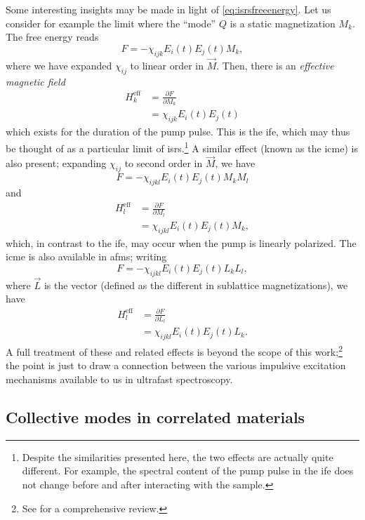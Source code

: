 Some interesting insights may be made in light of \cref{eq:isrsfreeenergy}.
Let us consider for example the limit where the ``mode'' $Q$ is a static magnetization $M_k$.
The free energy reads\citep{juraschek_phono-magnetic_2020}
\begin{equation}
F = -\chi_{ijk}E_i(t)E_j(t)M_k,
\end{equation}
where we have expanded $\chi_{ij}$ to linear order in $\vec{M}$.
Then, there is an \emph{effective magnetic field}
\begin{align}
H^\mathrm{eff}_k &= \frac{\partial F}{\partial M_k}\\
&= \chi_{ijk}E_i(t)E_j(t)
\end{align}
which exists for the duration of the pump pulse.
This is the \gls{ife}, which may thus be thought of as a particular limit of \gls{isrs}.\footnote{Despite the similarities presented here, the two effects are actually quite different. For example, the spectral content of the pump pulse in the \gls{ife} does not change before and after interacting with the sample\citep{gridnev_phenomenological_2008}.}
A similar effect (known as the \gls{icme}) is also present; expanding $\chi_{ij}$ to second order in $\vec{M}$, we have
\begin{equation}
F = -\chi_{ijkl}E_i(t)E_j(t)M_kM_l
\end{equation}
and
\begin{align}
H^\mathrm{eff}_l &= \frac{\partial F}{\partial M_l}\\
&= \chi_{ijkl}E_i(t)E_j(t)M_k,
\end{align}
which, in contrast to the \gls{ife}, may occur when the pump is linearly polarized.
The \gls{icme} is also available in \glspl{afm}; writing
\begin{equation}
F = -\chi_{ijkl}E_i(t)E_j(t)L_kL_l,
\end{equation}
where $\vec{L}$ is the \neel vector (defined as the different in sublattice magnetizations), we have
\begin{align}
H^\mathrm{eff}_l &= \frac{\partial F}{\partial L_l}\\
&= \chi_{ijkl}E_i(t)E_j(t)L_k.
\end{align}
A full treatment of these and related effects is beyond the scope of this work;\footnote{See \citet{kirilyuk_ultrafast_2010} for a comprehensive review.} the point is just to draw a connection between the various impulsive excitation mechanisms available to us in ultrafast spectroscopy.

\subsection{Collective modes in correlated materials}

